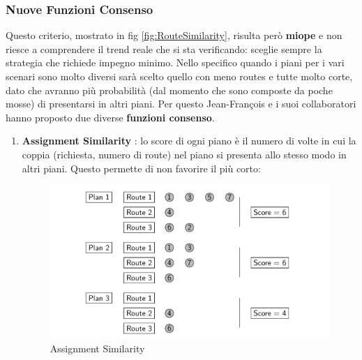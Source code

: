\documentclass[
    article,            %
    12pt,                %
    oneside,            %
    a4paper,            %
    english,            %
    italian,                %
    sumario=tradicional,
]{abntex2}
\begin{document}
\subsubsection{Nuove Funzioni Consenso}
Questo criterio, mostrato in fig \ref{fig:RouteSimilarity}, risulta però \textbf{miope} e non riesce a comprendere il trend reale che si sta verificando: sceglie sempre la strategia che richiede impegno minimo. Nello specifico quando i piani per i vari scenari sono molto diversi sarà scelto quello con meno routes e tutte molto corte, dato che avranno più probabilità (dal momento che sono composte da poche mosse) di presentarsi in altri piani. Per questo Jean-François e i suoi collaboratori hanno proposto due diverse \textbf{funzioni consenso}.

\begin{enumerate}
    \item \textbf{Assignment Similarity} : lo score di ogni piano è il numero di volte in cui la coppia (richiesta, numero di route) nel piano si presenta allo stesso modo in altri piani. Questo permette di non favorire il più corto:

    \begin{figure}[h!]
        \centering
        \includegraphics[scale=0.35]{Images/AssignmentSimilarity.png}
        \caption{Assignment Similarity}
        \label{fig:AssignmentSimilarity}
    \end{figure}
    

\end{enumerate}
\end{document}
